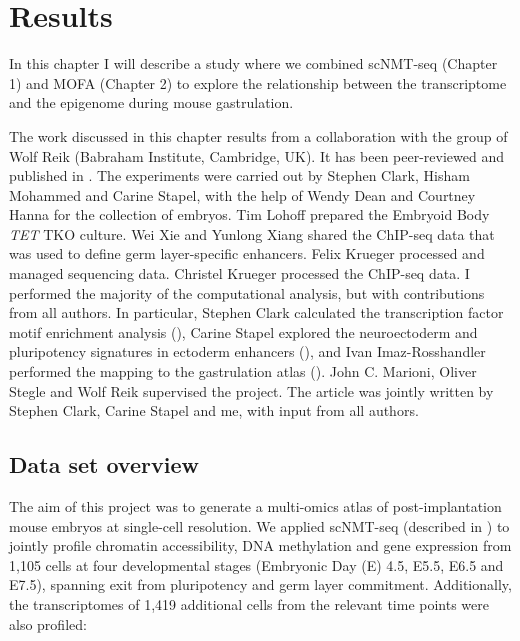 \graphicspath{{Chapter3/Figs/}}

\section{Results}


In this chapter I will describe a study where we combined scNMT-seq (Chapter 1) and MOFA (Chapter 2) to explore the relationship between the transcriptome and the epigenome during mouse gastrulation.

The work discussed in this chapter results from a collaboration with the group of Wolf Reik (Babraham Institute, Cambridge, UK). It has been peer-reviewed and published in \cite{Argelaguet2019}. The experiments were carried out by Stephen Clark, Hisham Mohammed and Carine Stapel, with the help of Wendy Dean and Courtney Hanna for the collection of embryos. Tim Lohoff prepared the Embryoid Body \textit{TET} TKO culture. Wei Xie and Yunlong Xiang shared the ChIP-seq data that was used to define germ layer-specific enhancers. Felix Krueger processed and managed sequencing data. Christel Krueger processed the ChIP-seq data. I performed the majority of the computational analysis, but with contributions from all authors. In particular, Stephen Clark calculated the transcription factor motif enrichment analysis (), Carine Stapel explored the neuroectoderm and pluripotency signatures in ectoderm enhancers (), and Ivan Imaz-Rosshandler performed the mapping to the gastrulation atlas (). John C. Marioni, Oliver Stegle and Wolf Reik supervised the project. The article was jointly written by Stephen Clark, Carine Stapel and me, with input from all authors.

\subsection{Data set overview}

The aim of this project was to generate a multi-omics atlas of post-implantation mouse embryos at single-cell resolution. We applied scNMT-seq (described in ) to jointly profile chromatin accessibility, DNA methylation and gene expression from 1,105 cells at four developmental stages (Embryonic Day (E) 4.5, E5.5, E6.5 and E7.5), spanning exit from pluripotency and germ layer commitment. Additionally, the transcriptomes of 1,419 additional cells from the relevant time points were also profiled:

